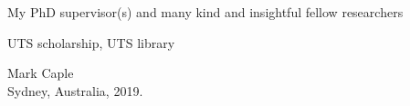 \thispagestyle{empty}
\begin{acknowledge}

My PhD supervisor(s) and many kind and insightful fellow researchers 

\vspace{6pt}
UTS scholarship, UTS library


\hfill Mark Caple\\
\vspace{4pt}
\hfill Sydney, Australia, 2019.

\end{acknowledge}
